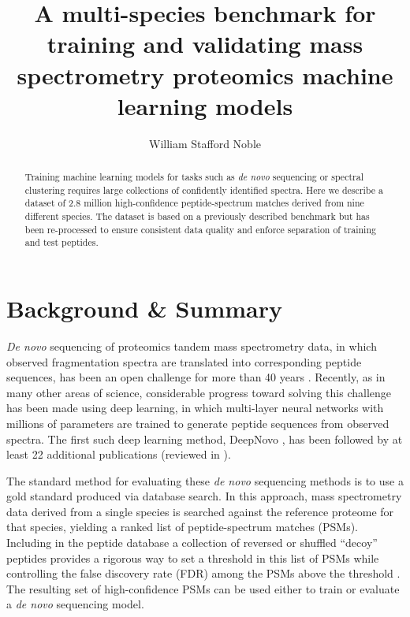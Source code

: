 \documentclass{article}
\title{A multi-species benchmark for training and validating mass spectrometry proteomics machine learning models}
\author[1,2]{William Stafford Noble}
\affil[1]{Department of Genome Sciences, University of Washington}
\affil[2]{Paul G.\ Allen School of Computer Science and Engineering, University of Washington}
\date{}
\begin{document}
\maketitle


\begin{abstract}
  Training machine learning models for tasks such as \textit{de novo} sequencing or spectral clustering requires large collections of confidently identified spectra.
  Here we describe a dataset of 2.8 million high-confidence peptide-spectrum matches derived from nine different species.
  The dataset is based on a previously described benchmark but has been re-processed to ensure consistent data quality and enforce separation of training and test peptides.
\end{abstract}

\section*{Background \& Summary}

\textit{De novo} sequencing of proteomics tandem mass spectrometry data, in which observed fragmentation spectra are translated into corresponding peptide sequences, has been an open challenge for more than 40 years \cite{sakurai1984paas}.
Recently, as in many other areas of science, considerable progress toward solving this challenge has been made using deep learning, in which multi-layer neural networks with millions of parameters are trained to generate peptide sequences from observed spectra.
The first such deep learning method, DeepNovo \cite{tran2017denovo}, has been followed by at least 22 additional publications (reviewed in \cite{bittremieux2024deep}).

The standard method for evaluating these \textit{de novo} sequencing methods is to use a gold standard produced via database search.
In this approach, mass spectrometry data derived from a single species is searched against the reference proteome for that species, yielding a ranked list of peptide-spectrum matches (PSMs).
Including in the peptide database a collection of reversed or shuffled ``decoy'' peptides provides a rigorous way to set a threshold in this list of PSMs while controlling the false discovery rate (FDR) among the PSMs above the threshold \cite{elias2007target}.
The resulting set of high-confidence PSMs can be used either to train or evaluate a \textit{de novo} sequencing model.
\end{document}
